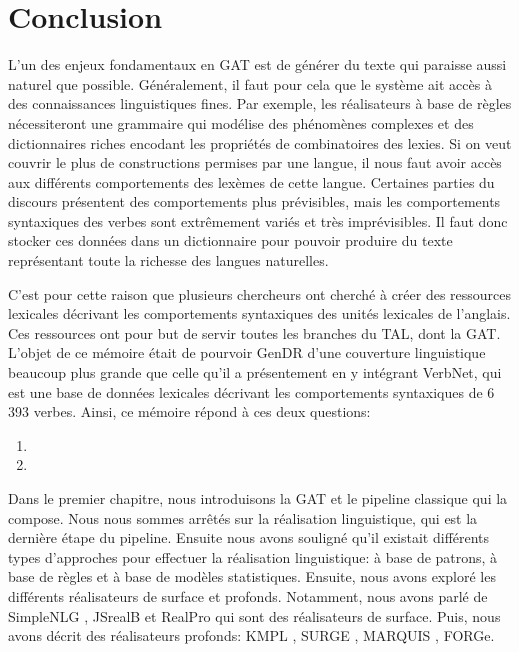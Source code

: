 
\chapter*{Conclusion}
L'un des enjeux fondamentaux en \ac{GAT} est de générer du texte qui paraisse aussi naturel que possible. Généralement, il faut pour cela que le système ait accès à des connaissances linguistiques fines. Par exemple, les réalisateurs à base de règles nécessiteront une grammaire qui modélise des phénomènes complexes et des dictionnaires riches encodant les propriétés de combinatoires des lexies. Si on veut couvrir le plus de constructions permises par une langue, il nous faut avoir accès aux différents comportements des lexèmes de cette langue. Certaines parties du discours présentent des comportements plus prévisibles, mais les comportements syntaxiques des verbes sont extrêmement variés et très imprévisibles. Il faut donc stocker ces données dans un dictionnaire pour pouvoir produire du texte représentant toute la richesse des langues naturelles.

C'est pour cette raison que plusieurs chercheurs ont cherché à créer des ressources lexicales décrivant les comportements syntaxiques des unités lexicales de l'anglais. Ces ressources ont pour but de servir toutes les branches du \ac{TAL}, dont la \ac{GAT}. L'objet de ce mémoire était de pourvoir GenDR d'une couverture linguistique beaucoup plus grande que celle qu'il a présentement en y intégrant VerbNet, qui est une base de données lexicales décrivant les comportements syntaxiques de 6\,393 verbes. Ainsi, ce mémoire répond à ces deux questions:

\begin{enumerate}
  \item {}
  \item {}
\end{enumerate}

Dans le premier chapitre, nous introduisons la \ac{GAT} et le pipeline classique qui la compose. Nous nous sommes arrêtés sur la réalisation linguistique, qui est la dernière étape du pipeline. Ensuite nous avons souligné qu'il existait différents types d'approches pour effectuer la réalisation linguistique: à base de patrons, à base de règles et à base de modèles statistiques. Ensuite, nous avons exploré les différents réalisateurs de surface et profonds. Notamment, nous avons parlé de SimpleNLG \citep{GattSimpleNLGRealisationEngine2009}, JSrealB \citep{MolinsJSrealBBilingualText2015} et RealPro \citep{LavoieFastPortableRealizer1997} qui sont des réalisateurs de surface. Puis, nous avons décrit des réalisateurs profonds: KMPL \cite{BatemanEnablingTechnologyMultilingual1997}, SURGE \citep{Elhadad98surge:a}, MARQUIS \citep{WannerMARQUISGENERATIONUSERTAILORED2010}, FORGe\citep{MilledemoFORGePompeu2017}.

